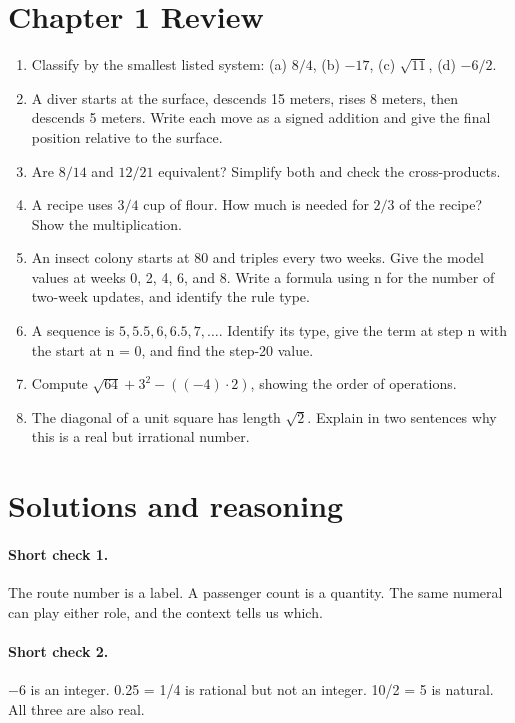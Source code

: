 \documentclass[12pt,letterpaper]{article}
\begin{document}
\section*{Chapter 1 Review}
\begin{enumerate}[label=R\arabic*.,leftmargin=2.5em,itemsep=10pt]
\item Classify by the smallest listed system: (a) $8/4$, (b) $-17$, (c) $\sqrt{11}$, (d) $-6/2$.
\item A diver starts at the surface, descends 15 meters, rises 8 meters, then descends 5 meters. Write each move as a signed addition and give the final position relative to the surface.
\item Are $8/14$ and $12/21$ equivalent? Simplify both and check the cross-products.
\item A recipe uses $3/4$ cup of flour. How much is needed for $2/3$ of the recipe? Show the multiplication.
\item An insect colony starts at 80 and triples every two weeks. Give the model values at weeks 0, 2, 4, 6, and 8. Write a formula using n for the number of two-week updates, and identify the rule type.
\item A sequence is $5,5.5,6,6.5,7,\ldots$. Identify its type, give the term at step n with the start at n = 0, and find the step-20 value.
\item Compute $\sqrt{64}+3^2-((-4)\cdot2)$, showing the order of operations.
\item The diagonal of a unit square has length $\sqrt2$. Explain in two sentences why this is a real but irrational number.
\end{enumerate}

\clearpage\section*{Solutions and reasoning}

\paragraph{Short check 1.}
The route number is a label. A passenger count is a quantity. The same numeral can play either role, and the context tells us which.


\paragraph{Short check 2.}
$-$6 is an integer. 0.25 = 1/4 is rational but not an integer. 10/2 = 5 is natural. All three are also real.
\end{document}
